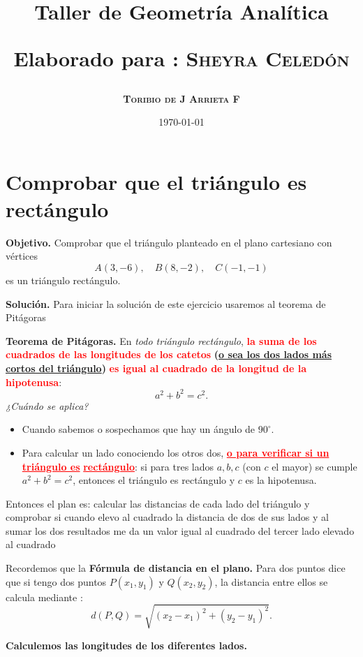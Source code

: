 \documentclass[12pt,a4paper]{article}
\title{\Large Taller de Geometría Analítica
	
\small{Elaborado para : \textsc{\bf{Sheyra Celedón}}}}
\author{\bf{\textsc{Toribio de J Arrieta F}}}
\date{\today}
\begin{document}
	\maketitle
	
\section{Comprobar que el triángulo es rectángulo}
	
	\textbf{Objetivo.} Comprobar que el triángulo planteado en el plano cartesiano con vértices
	\[
	A(3,-6),\quad B(8,-2),\quad C(-1,-1)
	\]
	es un triángulo rectángulo. 
	
	\vspace{5mm}

	\textbf{Solución.} Para iniciar la solución de este ejercicio usaremos al teorema de Pitágoras
	
	
	\bigskip
	
	\textbf{Teorema de Pitágoras.}
	En \emph{todo triángulo rectángulo}, \textcolor{red}{\textbf{la suma de los cuadrados de las longitudes de los catetos}} \textbf{(\underline{o sea los dos lados más cortos del triángulo})} \textcolor{red}{\textbf{es igual al cuadrado de la longitud de la hipotenusa}}:
	\[
	a^2+b^2=c^2.
	\]
	\emph{¿Cuándo se aplica?}
	\begin{itemize}
		\item Cuando sabemos o sospechamos que hay un ángulo de \(90^\circ\).
		\item Para calcular un lado conociendo los otros dos, \textcolor{red}{ \underline{\textbf{o para verificar si un triángulo es}}  \underline{\textbf{rectángulo}}}: si para tres lados \(a,b,c\) (con \(c\) el mayor) se cumple \(a^2+b^2=c^2\), entonces el triángulo es rectángulo y \(c\) es la hipotenusa.
	\end{itemize}
	
	Entonces el plan es: calcular las distancias de cada lado del triángulo y comprobar si cuando elevo al cuadrado la distancia de dos de sus lados y al sumar los dos resultados me da un valor igual al cuadrado del tercer lado elevado al cuadrado
	
	\bigskip
	
	Recordemos que la \textbf{Fórmula de distancia en el plano.}
	Para dos puntos dice que si tengo dos puntos  \(P(x_1,y_1)\) y \(Q(x_2,y_2)\), la distancia entre ellos se calcula mediante :
	\[
	d(P,Q)=\sqrt{(x_2-x_1)^2+(y_2-y_1)^2}.
	\]
	
	\bigskip
	
	\textbf{Calculemos las longitudes de los diferentes lados.}
	
\end{document}
